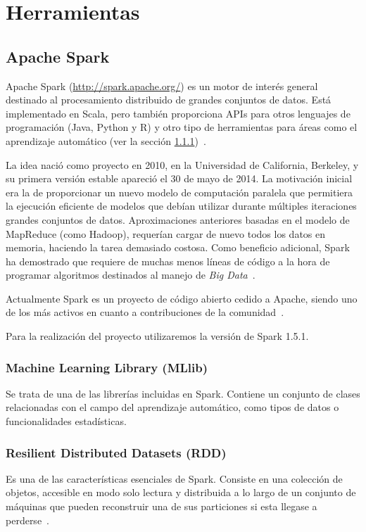 \section{Herramientas}

\subsection{Apache Spark}\label{sec:DefSpark}

Apache Spark (\url{http://spark.apache.org/}) es un motor de interés general destinado al procesamiento distribuido de grandes conjuntos de datos. Está implementado en Scala, pero también proporciona APIs para otros lenguajes de programación (Java, Python y R) y otro tipo de herramientas para áreas como el aprendizaje automático (ver la sección \ref{MLib})~\cite{SparkDoc}.

La idea nació como proyecto en 2010, en la Universidad de California, Berkeley, y su primera versión estable apareció el 30 de mayo de 2014. La motivación inicial era la de proporcionar un nuevo modelo de computación paralela que permitiera la ejecución eficiente de modelos que debían utilizar durante múltiples iteraciones grandes conjuntos de datos. Aproximaciones anteriores basadas en el modelo de MapReduce \cite{MapReducePaper}(como Hadoop), requerían cargar de nuevo todos los datos en memoria, haciendo la tarea demasiado costosa. Como beneficio adicional, Spark ha demostrado que requiere de muchas menos líneas de código a la hora de programar algoritmos destinados al manejo de \textit{Big Data}~\cite{SparkPaper}.

Actualmente Spark es un proyecto de código abierto cedido a Apache, siendo uno de los más activos en cuanto a contribuciones de la comunidad~\cite{ApacheContributions}. 

Para la realización del proyecto utilizaremos la versión de Spark 1.5.1.

\subsubsection{Machine Learning Library (MLlib)}\label{MLib}

Se trata de una de las librerías incluidas en Spark. Contiene un conjunto de clases relacionadas con el campo del aprendizaje automático, como tipos de datos o funcionalidades estadísticas.  

\subsubsection{Resilient Distributed Datasets (RDD)}\label{sec:DefRDD}
Es una de las características esenciales de Spark. Consiste en una colección de objetos, accesible en modo solo lectura y distribuida a lo largo de un conjunto de máquinas que pueden reconstruir una de sus particiones si esta llegase a perderse~\cite{SparkPaper}. 

